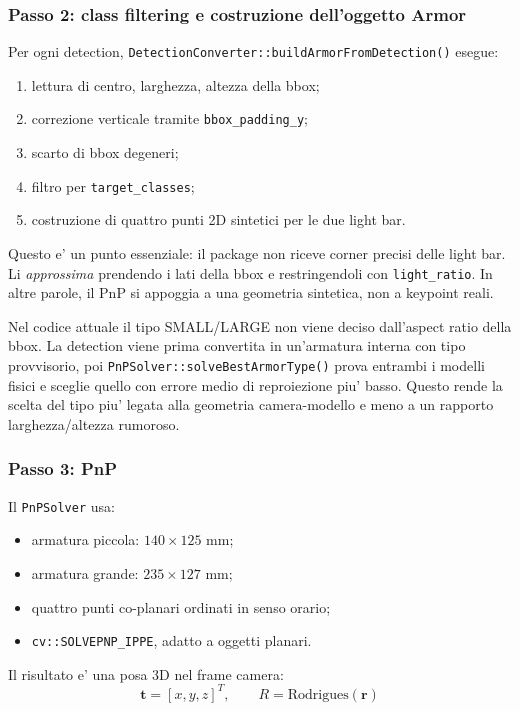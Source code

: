\documentclass[11pt,a4paper]{article}
\newcommand{\code}[1]{\texttt{#1}}
\begin{document}
\subsubsection{Passo 2: class filtering e costruzione dell'oggetto Armor}

Per ogni detection, \code{DetectionConverter::buildArmorFromDetection()} esegue:
\begin{enumerate}[leftmargin=1.4em]
  \item lettura di centro, larghezza, altezza della bbox;
  \item correzione verticale tramite \code{bbox\_padding\_y};
  \item scarto di bbox degeneri;
  \item filtro per \code{target\_classes};
  \item costruzione di quattro punti 2D sintetici per le due light bar.
\end{enumerate}

Questo e' un punto essenziale: il package non riceve corner precisi delle light bar. Li \emph{approssima} prendendo i lati della bbox e restringendoli con \code{light\_ratio}. In altre parole, il PnP si appoggia a una geometria sintetica, non a keypoint reali.

Nel codice attuale il tipo SMALL/LARGE non viene deciso dall'aspect ratio della bbox. La detection viene prima convertita in un'armatura interna con tipo provvisorio, poi \code{PnPSolver::solveBestArmorType()} prova entrambi i modelli fisici e sceglie quello con errore medio di reproiezione piu' basso. Questo rende la scelta del tipo piu' legata alla geometria camera-modello e meno a un rapporto larghezza/altezza rumoroso.

\subsubsection{Passo 3: PnP}

Il \code{PnPSolver} usa:
\begin{itemize}[leftmargin=1.4em]
  \item armatura piccola: \(140 \times 125\) mm;
  \item armatura grande: \(235 \times 127\) mm;
  \item quattro punti co-planari ordinati in senso orario;
  \item \code{cv::SOLVEPNP\_IPPE}, adatto a oggetti planari.
\end{itemize}

Il risultato e' una posa 3D nel frame camera:
\begin{equation}
  \mathbf{t} = [x, y, z]^T, \qquad R = \text{Rodrigues}(\mathbf{r})
\end{equation}
\end{document}
